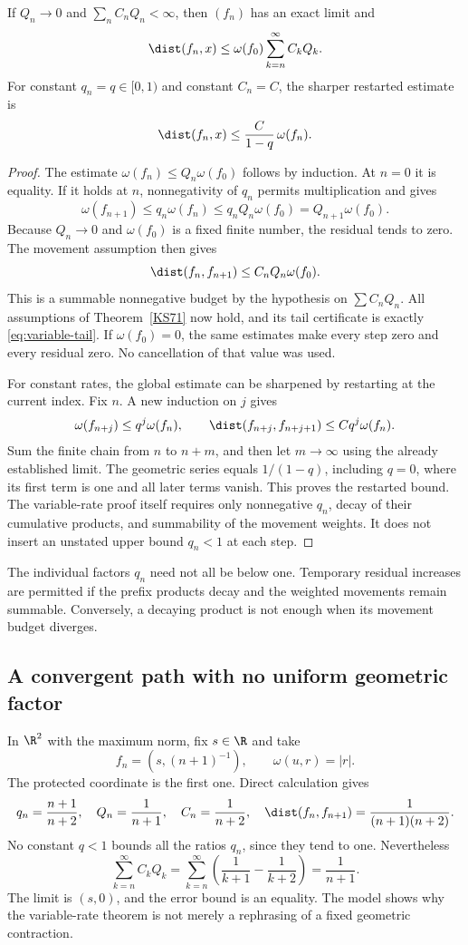 \begin{theorem}\label{KS72}
If \(Q_n\to0\) and \(\sum_n C_nQ_n<\infty\), then \((f_n)\) has an exact limit and
\begin{equation}\label{eq:variable-tail}
 \dist(f_n,x)\le\omega(f_0)\sum_{k=n}^{\infty}C_kQ_k.
\end{equation}
For constant \(q_n=q\in[0,1)\) and constant \(C_n=C\), the sharper restarted estimate is
\[
 \dist(f_n,x)\le\frac{C}{1-q}\,\omega(f_n).
\]
\end{theorem}
\begin{proof}
The estimate \(\omega(f_n)\le Q_n\omega(f_0)\) follows by induction. At \(n=0\) it is equality. If it holds at \(n\), nonnegativity of \(q_n\) permits multiplication and gives
\[
 \omega(f_{n+1})\le q_n\omega(f_n)
 \le q_nQ_n\omega(f_0)=Q_{n+1}\omega(f_0).
\]
Because \(Q_n\to0\) and \(\omega(f_0)\) is a fixed finite number, the residual tends to zero. The movement assumption then gives
\[
 \dist(f_n,f_{n+1})\le C_nQ_n\omega(f_0).
\]
This is a summable nonnegative budget by the hypothesis on \(\sum C_nQ_n\). All assumptions of Theorem~\ref{KS71} now hold, and its tail certificate is exactly \eqref{eq:variable-tail}. If \(\omega(f_0)=0\), the same estimates make every step zero and every residual zero. No cancellation of that value was used.

For constant rates, the global estimate can be sharpened by restarting at the current index. Fix \(n\). A new induction on \(j\) gives
\[
 \omega(f_{n+j})\le q^j\omega(f_n),\qquad
 \dist(f_{n+j},f_{n+j+1})\le Cq^j\omega(f_n).
\]
Sum the finite chain from \(n\) to \(n+m\), and then let \(m\to\infty\) using the already established limit. The geometric series equals \(1/(1-q)\), including \(q=0\), where its first term is one and all later terms vanish. This proves the restarted bound. The variable-rate proof itself requires only nonnegative \(q_n\), decay of their cumulative products, and summability of the movement weights. It does not insert an unstated upper bound \(q_n<1\) at each step.
\end{proof}
The individual factors \(q_n\) need not all be below one. Temporary residual increases are permitted if the prefix products decay and the weighted movements remain summable. Conversely, a decaying product is not enough when its movement budget diverges.

\subsection{A convergent path with no uniform geometric factor}
In \(\R^2\) with the maximum norm, fix \(s\in\R\) and take
\[
 f_n=(s,(n+1)^{-1}),\qquad \omega(u,r)=|r|.
\]
The protected coordinate is the first one. Direct calculation gives
\[
 q_n=\frac{n+1}{n+2},\quad Q_n=\frac1{n+1},\quad
 C_n=\frac1{n+2},\quad
 \dist(f_n,f_{n+1})=\frac1{(n+1)(n+2)}.
\]
No constant \(q<1\) bounds all the ratios \(q_n\), since they tend to one. Nevertheless
\[
 \sum_{k=n}^{\infty}C_kQ_k
 =\sum_{k=n}^{\infty}\left(\frac1{k+1}-\frac1{k+2}\right)
 =\frac1{n+1}.
\]
The limit is \((s,0)\), and the error bound is an equality. The model shows why the variable-rate theorem is not merely a rephrasing of a fixed geometric contraction.

